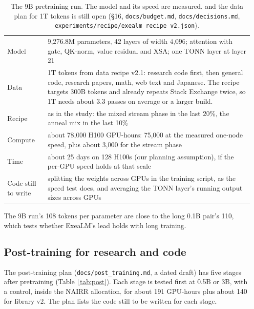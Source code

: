 \documentclass[11pt,letterpaper]{article}
\newcommand{\sect}[1]{\S#1}
\begin{document}
\begin{table}[H]
\centering\small
\caption{The 9B pretraining run. The model and its speed are measured, and the data plan for 1T tokens is still open (\sect{16}, \texttt{docs/budget.md}, \texttt{docs/decisions.md}, \texttt{experiments/recipe/exealm\_recipe\_v2.json}).}
\label{tab:ninebrun}
\begin{tabularx}{\linewidth}{@{}l L@{}}
\toprule
Model & 9,276.8M parameters, 42 layers of width 4,096; attention with gate, QK-norm, value residual and XSA; one TONN layer at layer 21 \\
Data & 1T tokens from data recipe v2.1: research code first, then general code, research papers, math, web text and Japanese. The recipe targets 300B tokens and already repeats Stack Exchange twice, so 1T needs about 3.3 passes on average or a larger build. \\
Recipe & as in the study: the mixed stream phase in the last 20\%, the anneal mix in the last 10\% \\
Compute & about 78,000 H100 GPU-hours: 75,000 at the measured one-node speed, plus about 3,000 for the stream phase \\
Time & about 25 days on 128 H100s (our planning assumption), if the per-GPU speed holds at that scale \\
Code still to write & splitting the weights across GPUs in the training script, as the speed test does, and averaging the TONN layer's running output sizes across GPUs \\
\bottomrule
\end{tabularx}
\end{table}

The 9B run's 108 tokens per parameter are close to the long 0.1B pair's 110, which tests whether ExeaLM's lead holds with long training.

\subsection{Post-training for research and code}

The post-training plan (\texttt{docs/post\_training.md}, a dated draft) has five stages after pretraining (Table~\ref{tab:post}).
Each stage is tested first at 0.5B or 3B, with a control, inside the NAIRR allocation, for about 191 GPU-hours plus about 140 for library v2.
The plan lists the code still to be written for each stage.
\end{document}
